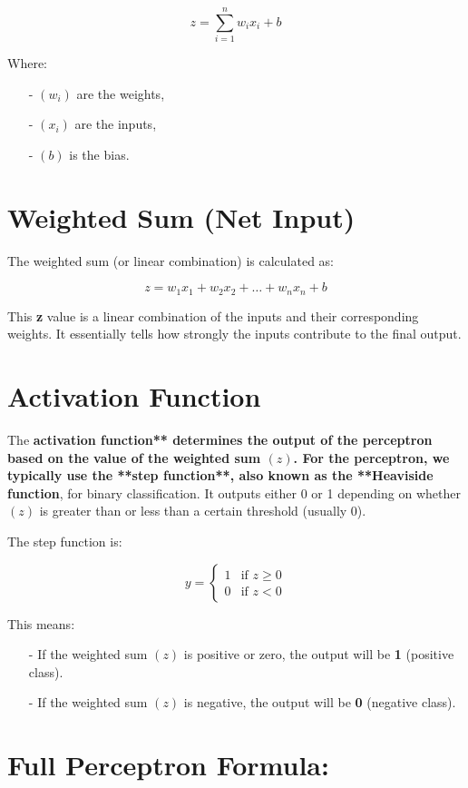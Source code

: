 \documentclass[10pt]{article}
\begin{document}
$$
z = \sum_{i=1}^{n} w_i x_i + b
$$

Where:
\begin{itemize}
   \item [-] $(w_i)$ are the weights,
   \item [-] $(x_i)$ are the inputs,
   \item [-] $(b)$ is the bias.
\end{itemize}

\section{{\bf Weighted Sum} (Net Input)}
The weighted sum (or linear combination) is calculated as:

$$
z = w_1 x_1 + w_2 x_2 + \dots + w_n x_n + b
$$

This {\bf z} value is a linear combination of the inputs and their corresponding weights. It essentially tells how strongly the inputs contribute to the final output.

\section{{\bf Activation Function}}
The {\bf activation function** determines the output of the perceptron based on the value of the weighted sum $(z)$. For the perceptron, we typically use the **step function**, also known as the **Heaviside function}, for binary classification. It outputs either 0 or 1 depending on whether $(z)$ is greater than or less than a certain threshold (usually 0).

The step function is:

$$
y = 
\begin{cases}
1 & \text{if } z \geq 0 \\
0 & \text{if } z < 0
\end{cases}
$$

This means:
\begin{itemize}
   \item [-] If the weighted sum $(z)$ is positive or zero, the output will be {\bf 1} (positive class).
   \item [-] If the weighted sum $(z)$ is negative, the output will be {\bf 0} (negative class).
\end{itemize}

\section{Full Perceptron Formula:}
\end{document}
